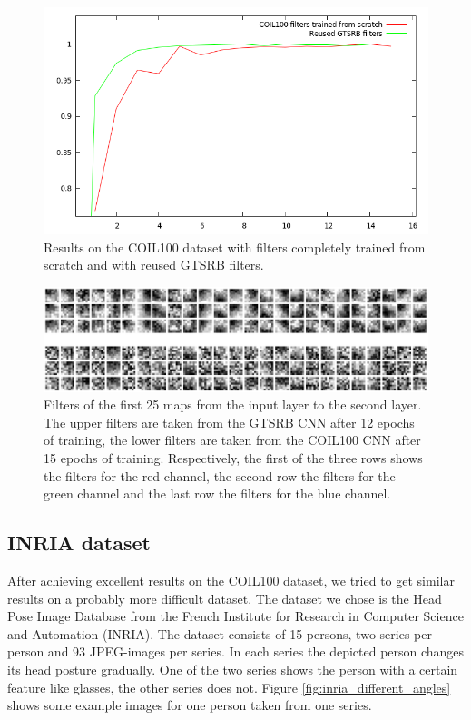 \documentclass[11pt, a4paper]{article}
\begin{document}
\begin{figure}[h!]
	\centering
	\includegraphics[width=1\textwidth]{coil100_results.png}
	\caption{Results on the COIL100 dataset with filters completely trained from scratch and with reused GTSRB filters.}
	\label{fig:coil100_results}
\end{figure}

\begin{figure}[h!]
	\centering
	\includegraphics[width=1\textwidth]{gtsrb_vs_coil_filters.png}
	\caption{Filters of the first 25 maps from the input layer to the second layer. The upper filters are taken from the GTSRB CNN after 12 epochs of training, the lower filters are taken from the COIL100 CNN after 15 epochs of training. Respectively, the first of the three rows shows the filters for the red channel, the second row the filters for the green channel and the last row the filters for the blue channel.}
	\label{fig:gtsrb_vs_coil_filters}
\end{figure}


\subsection{INRIA dataset}

After achieving excellent results on the COIL100 dataset, we tried to get similar results on a probably more difficult dataset. The dataset we chose is the Head Pose Image Database \cite{estimating-face-orientation-inria} from the French Institute for Research in Computer Science and Automation (INRIA). The dataset consists of 15 persons, two series per person and 93 JPEG-images per series. In each series the depicted person changes its head posture gradually. One of the two series shows the person with a certain feature like glasses, the other series does not. Figure \ref{fig:inria_different_angles} shows some example images for one person taken from one series.
\end{document}
